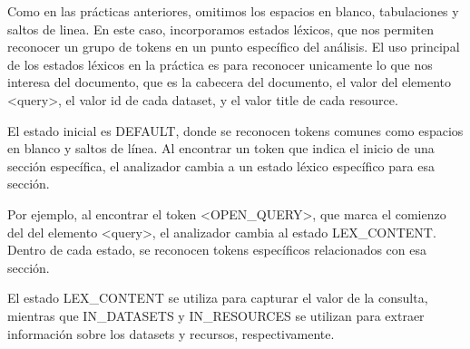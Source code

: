 Como en las prácticas anteriores, omitimos los espacios en blanco, tabulaciones y saltos de linea. En este caso, incorporamos estados léxicos, que nos permiten reconocer un grupo de tokens en un punto específico del análisis. 
El uso principal de los estados léxicos en la práctica es para reconocer unicamente lo que nos interesa del documento, que es la cabecera del documento, el valor del elemento <query>, el valor id de cada dataset, y el valor title de cada resource. 


El estado inicial es DEFAULT, donde se reconocen tokens comunes como espacios en blanco y saltos de línea. Al encontrar un token que indica el inicio de una sección específica, el analizador cambia a un estado léxico específico para esa sección.

Por ejemplo, al encontrar el token <OPEN\_QUERY>, que marca el comienzo del del elemento <query>, el analizador cambia al estado LEX\_CONTENT. Dentro de cada estado, se reconocen tokens específicos relacionados con esa sección.

El estado LEX\_CONTENT se utiliza para capturar el valor de la consulta, mientras que IN\_DATASETS y IN\_RESOURCES se utilizan para extraer información sobre los datasets y recursos, respectivamente.


